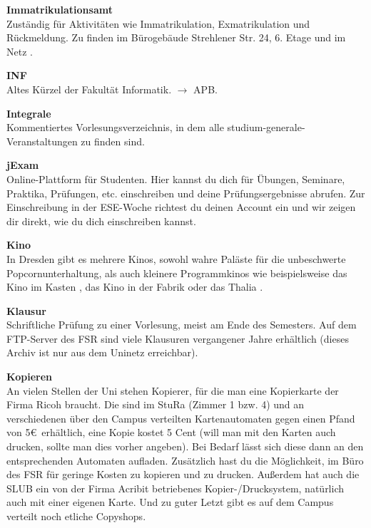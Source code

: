 \begin{multicols}{2}
\textbf{Immatrikulationsamt} \\
Zuständig für Aktivitäten wie Immatrikulation, Exmatrikulation und Rückmeldung.
Zu finden im Bürogebäude Strehlener Str. 24, 6. Etage und im Netz .

\textbf{INF} \\
Altes Kürzel der Fakultät Informatik.
$\rightarrow$ APB.

\textbf{Integrale} \\
Kommentiertes Vorlesungsverzeichnis, in dem alle studium-generale-Veranstaltungen zu finden sind. 

\textbf{jExam} \\
Online-Plattform für Studenten.
Hier kannst du dich für Übungen, Seminare, Praktika, Prüfungen, etc. einschreiben und deine Prüfungsergebnisse abrufen.
Zur Einschreibung in der ESE-Woche richtest du deinen Account ein und wir zeigen dir direkt, wie du dich einschreiben kannst. 

\textbf{Kino} \\
In Dresden gibt es mehrere Kinos, sowohl wahre Paläste für die unbeschwerte Popcornunterhaltung, als auch kleinere Programmkinos wie beispielsweise das Kino im Kasten , das Kino in der Fabrik  oder das Thalia .

\textbf{Klausur} \\
Schriftliche Prüfung zu einer Vorlesung, meist am Ende des Semesters.
Auf dem FTP-Server des FSR  sind viele Klausuren vergangener Jahre erhältlich (dieses Archiv ist nur aus dem Uninetz erreichbar).

\vfill\columnbreak

\textbf{Kopieren} \\
An vielen Stellen der Uni stehen Kopierer, für die man eine Kopierkarte der Firma Ricoh braucht. Die sind im StuRa (Zimmer 1 bzw. 4) und an verschiedenen über den Campus verteilten Kartenautomaten gegen einen Pfand von 5\euro\ erhältlich, eine Kopie kostet 5 Cent (will man mit den Karten auch drucken, sollte man dies vorher angeben).
Bei Bedarf lässt sich diese dann an den entsprechenden Automaten aufladen.
Zusätzlich hast du die Möglichkeit, im Büro des FSR für geringe Kosten zu kopieren und zu drucken.
Außerdem hat auch die SLUB ein von der Firma Acribit betriebenes Kopier-/Drucksystem, natürlich auch mit einer eigenen Karte.
Und zu guter Letzt gibt es auf dem Campus verteilt noch etliche Copyshops.


\end{multicols}
